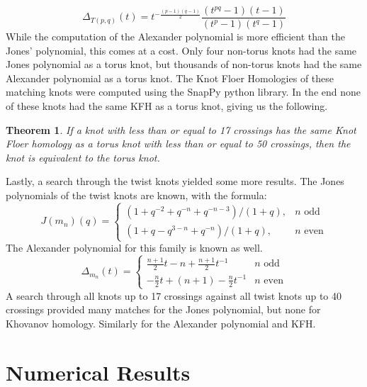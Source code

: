 \documentclass{article}
\theoremstyle{plain}
\newtheorem{theorem}{Theorem}
\begin{document}
        \begin{equation}
            \Delta_{T(p,q)}(t)=
            t^{-\frac{(p-1)(q-1)}{2}}\frac{(t^{pq}-1)(t-1)}{(t^{p}-1)(t^{q}-1)}
        \end{equation}
        While the computation of the Alexander polynomial is more efficient
        than the Jones' polynomial, this comes at a cost. Only four non-torus
        knots had the same Jones polynomial as a torus knot, but thousands of
        non-torus knots had the same Alexander polynomial as a torus knot.
        The Knot Floer Homologies of these matching knots were computed using
        the SnapPy python library. In the end none of these knots had the same
        KFH as a torus knot, giving us the following.
        \begin{theorem}
            If a knot with less than or equal to 17 crossings has the same
            Knot Floer homology as a torus knot with less than or equal to 50
            crossings, then the knot is equivalent to the torus knot.
        \end{theorem}
        Lastly, a search through the twist knots yielded some more results.
        The Jones polynomials of the twist knots are known, with the formula:
        \begin{equation}
            J(m_{n})(q)=
            \begin{cases}
                (1+q^{-2}+q^{-n}+q^{-n-3})/(1+q),&n\textrm{ odd}\\
                (1+q-q^{3-n}+q^{-n})/(1+q),&n\textrm{ even}
            \end{cases}
        \end{equation}
        The Alexander polynomial for this family is known as well.
        \begin{equation}
            \Delta_{m_{n}}(t)=
            \begin{cases}
                \frac{n+1}{2}t-n+\frac{n+1}{2}t^{-1}&n\textrm{ odd}\\
                -\frac{n}{2}t+(n+1)-\frac{n}{2}t^{-1}&n\textrm{ even}
            \end{cases}
        \end{equation}
        A search through all knots up to 17 crossings against all twist knots
        up to 40 crossings provided many matches for the Jones polynomial, but
        none for Khovanov homology. Similarly for the Alexander polynomial and
        KFH.
    \section{Numerical Results}
\end{document}
